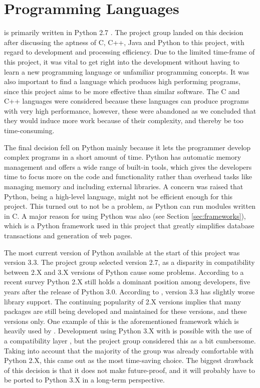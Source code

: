 \section{Programming Languages}
\snowman{} is primarily written in Python 2.7 \cite{pythondoc}. The project
group landed on this decision after discussing the aptness of C, C++, Java and
Python to this project, with regard to development and processing efficiency.
Due to the limited time-frame of this project, it was vital to get right into
the development without having to learn a new programming language or unfamiliar
programming concepts. It was also important to find a language which produces
high performing programs, since this project aims to be more effective than
similar software. The C and C++ languages were considered because these
languages can produce programs with very high performance, however, these were
abandoned as we concluded that they would induce more work because of their
complexity, and thereby be too time-consuming.

The final decision fell on Python mainly because it lets the
programmer develop complex programs in a short amount of time. Python has
automatic memory management and offers a wide range of built-in tools, which
gives the developers time to focus more on the code and functionality rather
than overhead tasks like managing memory and including external libraries. A
concern was raised that Python, being a high-level language, might not be
efficient enough for this project. This turned out to not be a problem, as
Python can run modules written in C. A major reason for using Python was also
\django{} (see Section \ref{sec:frameworks}), which is a Python framework used
in this project that greatly simplifies database transactions and generation of
web pages.

The most current version of Python available at the start of this project
was version 3.3. The project group selected version 2.7, as a disparity in
compatibility \cite{usepython2} between 2.X and 3.X versions of Python cause
some problems. According to a recent survey \cite{pythonusagesurvey}
Python 2.X still holds a dominant position among developers, five years after
the release of Python 3.0. According to \cite{usepython2}, version 3.3 has
slightly worse library support. The continuing popularity of 2.X versions
implies that many packages are still being developed and maintained for these
versions, and these versions only. One example of this is the aforementioned
\django{} framework which is heavily used by \snowman{}.
Development using Python 3.X with \django{} is possible with the use of a
compatibility layer \cite{djangodoc}, but the project group considered this as a
bit cumbersome. Taking into account that the majority of the group was already
comfortable with Python 2.X, this came out as the most time-saving choice. The
biggest drawback of this decision is that it does not make \snowman{}
future-proof, and it will probably have to be ported to Python 3.X in a
long-term perspective.

